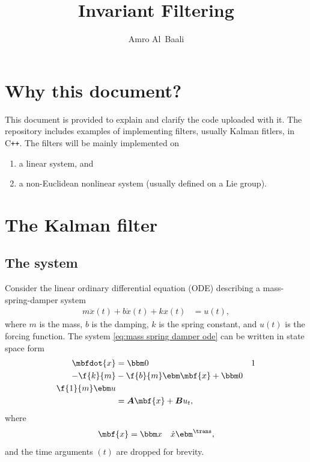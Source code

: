 \documentclass[nobib]{tufte-handout}
\title{Invariant Filtering}
\author{Amro Al~Baali}
\newcommand{\cpp}{C\texttt{++}\xspace}
\begin{document}
    {    
        
        \tableofcontents
        \clearpage
    }

    \section{Why this document?}
    This document is provided to explain and clarify the code uploaded with it. The repository includes examples of implementing filters, usually Kalman fitlers, in \cpp. The filters will be mainly implemented on 
    \begin{enumerate}
        \item a linear system, and
        \item a non-Euclidean nonlinear system (usually defined on a Lie group).
    \end{enumerate}

    \section{The Kalman filter}
    \subsection{The system}
    Consider the linear ordinary differential equation (ODE) describing a mass-spring-damper system
    \begin{align}
        \label{eq:mass spring damper ode}
        m\ddot{x}(t) + b\dot{x}(t) + kx(t) &= u(t),
    \end{align}
    where $m$ is the mass, $b$ is the damping, $k$ is the spring constant, and $u(t)$ is the forcing function. The system \eqref{eq:mass spring damper ode} can be written in state space form
    \begin{align}
        \mbfdot{x} &= \bbm 0 & 1\\ -\f{k}{m} & -\f{b}{m} \ebm \mbf{x} + \bbm 0\\\f{1}{m} \ebm u\\
        &= \boldsymbol{A}\mbf{x} + \boldsymbol{B}u_{t},
    \end{align}
    where 
    \begin{align}
        \label{eq:DT linear kinematic model}
        \mbf{x} &= \bbm x & \dot{x} \ebm^{\trans},
    \end{align}
    and the time arguments $(t)$ are dropped for brevity.
\end{document}
